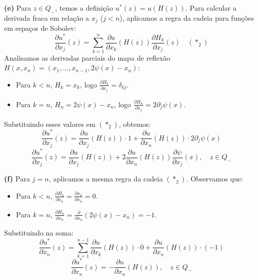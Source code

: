 \documentclass[cs_edp_2026.1.tex]{subfiles} %
\begin{document}
{	\textbf{(e)} Para $z \in Q_-$, temos a definição $u^*(z) = u(H(z))$. Para calcular a derivada fraca em relação a $x_j$ ($j < n$), aplicamos a regra da cadeia para funções em espaços de Sobolev:
	$$\frac{\partial u^*}{\partial x_j}(z) = \sum_{k=1}^{n} \frac{\partial u}{\partial x_k}(H(z)) \frac{\partial H_k}{\partial x_j}(z) \quad (\ast_2)$$
	Analisamos as derivadas parciais do mapa de reflexão $H(x, x_n) = (x_1, \dots, x_{n-1}, 2\psi(x) - x_n)$:
	\begin{itemize}
		\item Para $k < n$, $H_k = x_k$, logo $\frac{\partial H_k}{\partial x_j} = \delta_{kj}$.
		\item Para $k = n$, $H_n = 2\psi(x) - x_n$, logo $\frac{\partial H_n}{\partial x_j} = 2\partial_j \psi(x)$.
	\end{itemize}
	Substituindo esses valores em $(\ast_2)$, obtemos:
	$$\frac{\partial u^*}{\partial x_j}(z) = \frac{\partial u}{\partial x_j}(H(z)) \cdot 1 + \frac{\partial u}{\partial x_n}(H(z)) \cdot 2\partial_j \psi(x)$$
	$$\boxed{\frac{\partial u^*}{\partial x_j}(z) = \frac{\partial u}{\partial x_j}(H(z)) + 2 \frac{\partial u}{\partial x_n}(H(z)) \frac{\partial \psi}{\partial x_j}(x), \quad z \in Q_-}$$
	
	\textbf{(f)} Para $j = n$, aplicamos a mesma regra da cadeia $(\ast_2)$. Observamos que:
	\begin{itemize}
		\item Para $k < n$, $\frac{\partial H_k}{\partial x_n} = \frac{\partial x_k}{\partial x_n} = 0$.
		\item Para $k = n$, $\frac{\partial H_n}{\partial x_n} = \frac{\partial}{\partial x_n}(2\psi(x) - x_n) = -1$.
	\end{itemize}
	Substituindo na soma:
	$$\frac{\partial u^*}{\partial x_n}(z) = \sum_{k=1}^{n-1} \frac{\partial u}{\partial x_k}(H(z)) \cdot 0 + \frac{\partial u}{\partial x_n}(H(z)) \cdot (-1)$$
	$$\boxed{\frac{\partial u^*}{\partial x_n}(z) = -\frac{\partial u}{\partial x_n}(H(z)), \quad z \in Q_-}$$
	
}
\end{document}
